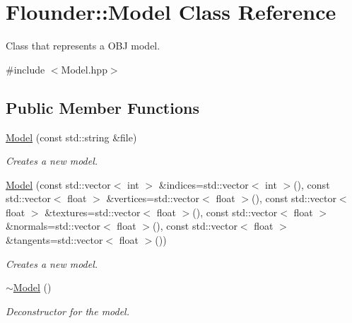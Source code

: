 \hypertarget{class_flounder_1_1_model}{}\section{Flounder\+:\+:Model Class Reference}
\label{class_flounder_1_1_model}


Class that represents a O\+BJ model.  




{\ttfamily \#include $<$Model.\+hpp$>$}

\subsection*{Public Member Functions}
\begin{DoxyCompactItemize}
\item 
\hyperlink{class_flounder_1_1_model_a85873f1078a62ced199618a15b714f84}{Model} (const std\+::string \&file)
\begin{DoxyCompactList}\small\item\em Creates a new model. \end{DoxyCompactList}\item 
\hyperlink{class_flounder_1_1_model_abe98e13245b02e170207516a1c09501a}{Model} (const std\+::vector$<$ int $>$ \&indices=std\+::vector$<$ int $>$(), const std\+::vector$<$ float $>$ \&vertices=std\+::vector$<$ float $>$(), const std\+::vector$<$ float $>$ \&textures=std\+::vector$<$ float $>$(), const std\+::vector$<$ float $>$ \&normals=std\+::vector$<$ float $>$(), const std\+::vector$<$ float $>$ \&tangents=std\+::vector$<$ float $>$())
\begin{DoxyCompactList}\small\item\em Creates a new model. \end{DoxyCompactList}\item 
\hyperlink{class_flounder_1_1_model_ab96efcd72832230d06f4414a35bd4eb0}{$\sim$\+Model} ()
\begin{DoxyCompactList}\small\item\em Deconstructor for the model. \end{DoxyCompactList}\end{DoxyCompactItemize}

